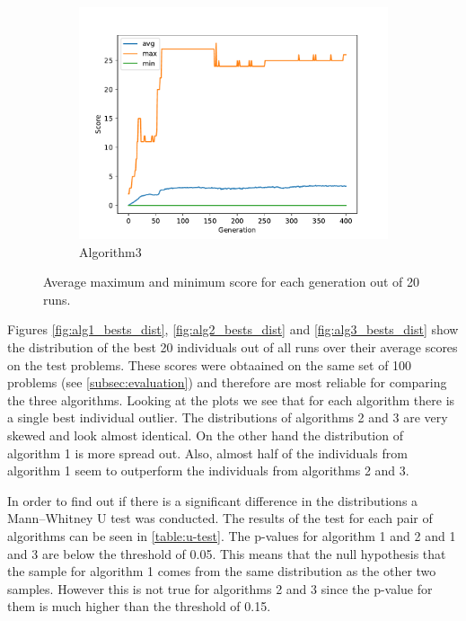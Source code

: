 \documentclass[12pt,a4paper]{article}
\begin{document}
\begin{figure}[h!]
\begin{subfigure}{.33\textwidth}
				\includegraphics[width=\linewidth]{../code/plots/alg3_score}
				\caption{Algorithm3}
				\label{fig:alg3_score}
			\end{subfigure}
			
			\caption{Average maximum and minimum score for each generation out of 20 runs.}
			\label{fig:score}
		\end{figure}
		Figures \autoref{fig:alg1_bests_dist}, \autoref{fig:alg2_bests_dist} and \autoref{fig:alg3_bests_dist} show the distribution of the best 20 individuals out of all runs over their average scores on the test problems. These scores were obtaained on the same set of 100 problems (see \autoref{subsec:evaluation}) and therefore are most reliable for comparing the three algorithms. Looking at the plots we see that for each algorithm there is a single best individual outlier. The distributions of algorithms 2 and 3 are very skewed and look almost identical. On the other hand the distribution of algorithm 1 is more spread out. Also, almost half of the individuals from algorithm 1 seem to outperform the individuals from algorithms 2 and 3.
		
		In order to find out if there is a significant difference in the distributions a Mann–Whitney U test was conducted. The results of the test for each pair of algorithms can be seen in \autoref{table:u-test}. The p-values for algorithm 1 and 2 and 1 and 3 are below the threshold of 0.05. This means that the null hypothesis that the sample for algorithm 1 comes from the same distribution as the other two samples. However this is not true for algorithms 2 and 3 since the p-value for them is much higher than the threshold of 0.15.
		
\end{document}
